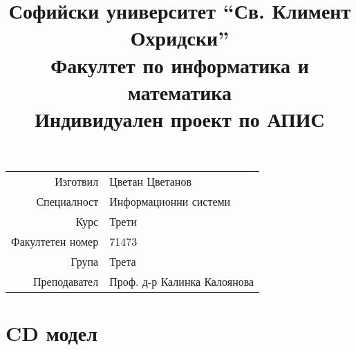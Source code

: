 \documentclass[a4paper,12pt]{article}
\begin{document}
\title{
  Софийски университет ``Св. Климент Охридски''\\
  Факултет по информатика и математика\\
  Индивидуален проект по АПИС
}
\author{}
\date{}

\maketitle

\begin{center}
\begin{tabular}{r|l}
Изготвил & Цветан Цветанов \\
Специалност & Информационни системи \\
Курс & Трети \\
Факултетен номер & 71473 \\
Група & Трета \\
Преподавател & Проф. д-р Калинка Калоянова \\
\end{tabular}
\end{center}

\newpage

\tableofcontents

\newpage

\section{CD модел}
\end{document}

